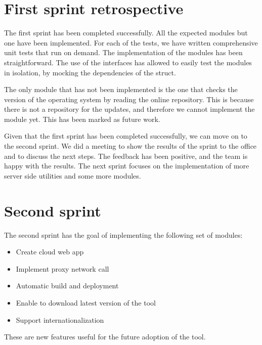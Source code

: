 \section{First sprint retrospective}

The first sprint has been completed successfully. All the expected modules but one have been implemented. For each of the tests, we have written comprehensive unit tests that run on demand. The implementation of the modules has been straightforward. The use of the interfaces has allowed to easily test the modules in isolation, by mocking the dependencies of the struct.

The only module that has not been implemented is the one that checks the version of the operating system by reading the online repository. This is because there is not a repository for the updates, and therefore we cannot implement the module yet. This has been marked as future work.

Given that the first sprint has been completed successfully, we can move on to the second sprint. We did a meeting to show the results of the sprint to the office and to discuss the next steps. The feedback has been positive, and the team is happy with the results. The next sprint focuses on the implementation of more server side utilities and some more modules.

\section{Second sprint}

The second sprint has the goal of implementing the following set of modules:

\begin{itemize}
  \item Create cloud web app
  \item Implement proxy network call
  \item Automatic build and deployment
  \item Enable to download latest version of the tool
  \item Support internationalization
\end{itemize}

These are new features useful for the future adoption of the tool.

